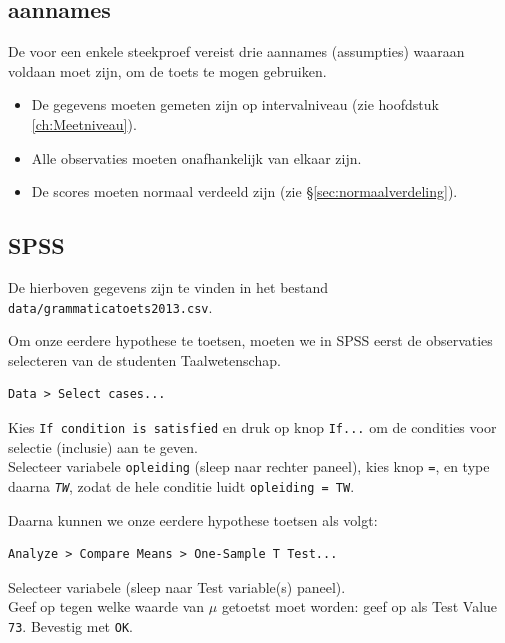 \documentclass[
]{book}
\begin{document}
\hypertarget{sec:ttoets-aannames}{%
\subsection{aannames}\label{sec:ttoets-aannames}}

De voor een enkele steekproef vereist drie aannames (assumpties) waaraan
voldaan moet zijn, om de toets te mogen gebruiken.

\begin{itemize}
\item
  De gegevens moeten gemeten zijn op intervalniveau (zie
  hoofdstuk \ref{ch:Meetniveau}).
\item
  Alle observaties moeten onafhankelijk van elkaar zijn.
\item
  De scores moeten normaal verdeeld zijn (zie
  §\ref{sec:normaalverdeling}).
\end{itemize}

\hypertarget{spss-10}{%
\subsection{SPSS}\label{spss-10}}

De hierboven gegevens zijn te vinden in het bestand \texttt{data/grammaticatoets2013.csv}.

Om onze eerdere hypothese te toetsen, moeten we in SPSS eerst de
observaties selecteren van de studenten Taalwetenschap.

\begin{verbatim}
Data > Select cases...
\end{verbatim}

Kies \texttt{If\ condition\ is\ satisfied} en druk op knop \texttt{If...} om de condities
voor selectie (inclusie) aan te geven.\\
Selecteer variabele \texttt{opleiding} (sleep naar rechter paneel), kies knop
\texttt{=}, en type daarna \emph{\texttt{TW}}, zodat de hele conditie luidt
\texttt{opleiding\ =\ TW}.

Daarna kunnen we onze eerdere hypothese toetsen als volgt:

\begin{verbatim}
Analyze > Compare Means > One-Sample T Test...
\end{verbatim}

Selecteer variabele (sleep naar Test variable(s) paneel).\\
Geef op tegen welke waarde van \(\mu\) getoetst moet worden: geef op als
Test Value \texttt{73}. Bevestig met \texttt{OK}.
\end{document}
